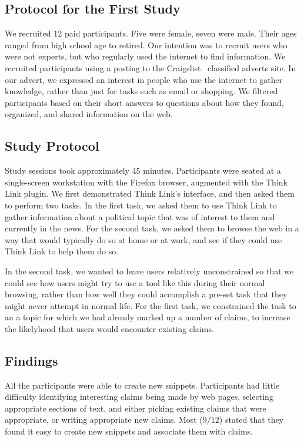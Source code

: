 \documentclass{chi2009}
\begin{document}
\subsection{Protocol for the First Study}

We recruited 12 paid participants. Five were female, seven were male. Their ages ranged from high school age to retired. Our intention was to recruit users who were not experts, but who regularly used the internet to find information. We recruited participants using a posting to the Craigslist~\cite{craigslist} classified adverts site. In our advert, we expressed an interest in people who use the internet to gather knowledge, rather than just for tasks such as email or shopping. We filtered participants based on their short answers to questions about how they found, organized, and shared information on the web. 

\subsection{Study Protocol}

Study sessions took approximately 45 minutes. Participants were seated at a single-screen workstation with the Firefox browser, augmented with the Think Link plugin. We first demonstrated Think Link's interface, and then asked them to perform two tasks. In the first task, we asked them to use Think Link to gather information about a political topic that was of interest to them and currently in the news. For the second task, we asked them to browse the web in a way that would typically do so at home or at work, and see if they could use Think Link to help them do so.

In the second task, we wanted to leave users relatively unconstrained so that we could see how users might try to use a tool like this during their normal browsing, rather than how well they could accomplish a pre-set task that they might never attempt in normal life. For the first task, we constrained the task to an a topic for which we had already marked up a number of claims, to increase the likelyhood that users would encounter existing claims.


\subsection{Findings}

All the participants were able to create new snippets. Participants had little difficulty identifying interesting claims being made by web pages, selecting appropriate sections of text, and either picking existing claims that were appropriate, or writing appropriate new claims. Most ($9/12$) stated that they found it easy to create new snippets and associate them with claims.
\end{document}
